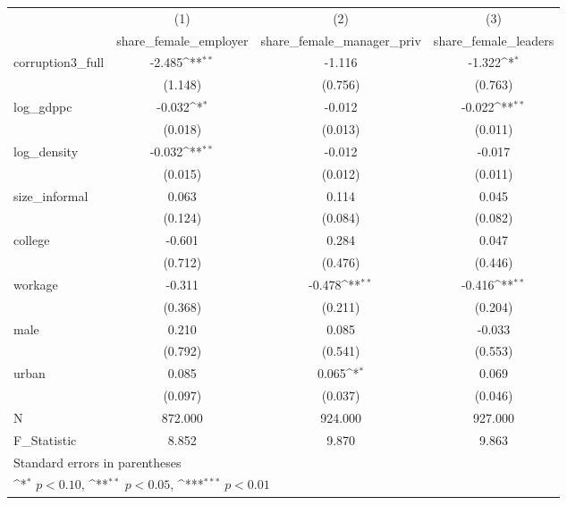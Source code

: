 {
\def\sym#1{\ifmmode^{#1}\else\(^{#1}\)\fi}
\begin{tabular}{l*{3}{c}}
\hline\hline
            &\multicolumn{1}{c}{(1)}&\multicolumn{1}{c}{(2)}&\multicolumn{1}{c}{(3)}\\
            &\multicolumn{1}{c}{share\_female\_employer}&\multicolumn{1}{c}{share\_female\_manager\_priv}&\multicolumn{1}{c}{share\_female\_leaders}\\
\hline
corruption3\_full&      -2.485\sym{**} &      -1.116         &      -1.322\sym{*}  \\
            &     (1.148)         &     (0.756)         &     (0.763)         \\
[1em]
log\_gdppc   &      -0.032\sym{*}  &      -0.012         &      -0.022\sym{**} \\
            &     (0.018)         &     (0.013)         &     (0.011)         \\
[1em]
log\_density &      -0.032\sym{**} &      -0.012         &      -0.017         \\
            &     (0.015)         &     (0.012)         &     (0.011)         \\
[1em]
size\_informal&       0.063         &       0.114         &       0.045         \\
            &     (0.124)         &     (0.084)         &     (0.082)         \\
[1em]
college     &      -0.601         &       0.284         &       0.047         \\
            &     (0.712)         &     (0.476)         &     (0.446)         \\
[1em]
workage     &      -0.311         &      -0.478\sym{**} &      -0.416\sym{**} \\
            &     (0.368)         &     (0.211)         &     (0.204)         \\
[1em]
male        &       0.210         &       0.085         &      -0.033         \\
            &     (0.792)         &     (0.541)         &     (0.553)         \\
[1em]
urban       &       0.085         &       0.065\sym{*}  &       0.069         \\
            &     (0.097)         &     (0.037)         &     (0.046)         \\
\hline
N           &     872.000         &     924.000         &     927.000         \\
F\_Statistic &       8.852         &       9.870         &       9.863         \\
\hline\hline
\multicolumn{4}{l}{\footnotesize Standard errors in parentheses}\\
\multicolumn{4}{l}{\footnotesize \sym{*} \(p<0.10\), \sym{**} \(p<0.05\), \sym{***} \(p<0.01\)}\\
\end{tabular}
}
